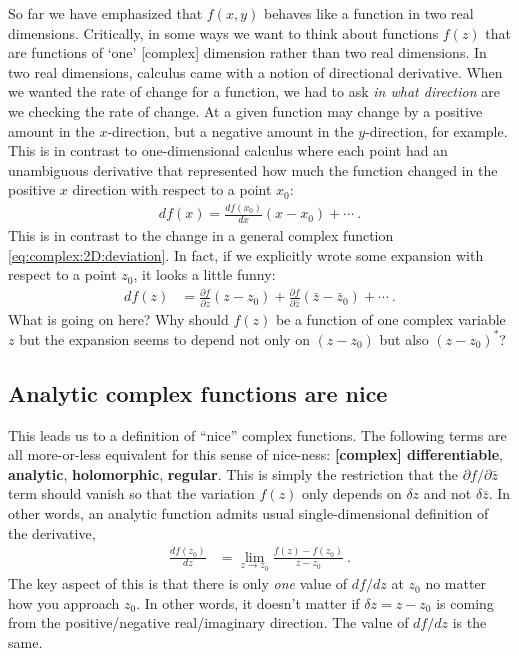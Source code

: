 So far we have emphasized that $f(x,y)$ behaves like a function in two real dimensions. Critically, in some ways we want to think about functions $f(z)$ that are functions of `one' [complex] dimension rather than two real dimensions. In two real dimensions, calculus came with a notion of directional derivative. When we wanted the rate of change for a function, we had to ask \emph{in what direction} are we checking the rate of change. At a given function may change by a positive amount in the $x$-direction, but a negative amount in the $y$-direction, for example. This is in contrast to one-dimensional calculus where each point had an unambiguous derivative that represented how much the function changed in the positive $x$ direction with respect to a point $x_0$:
\begin{align}
	df(x) = \frac{d f(x_0)}{d x} (x-x_0) + \cdots \ .
\end{align}
This is in contrast to the change in a general complex function \eqref{eq:complex:2D:deviation}. In fact, if we explicitly wrote some expansion with respect to a point $z_0$, it looks a little funny:
\begin{align}
	df(z) &= 
	\frac{\partial f}{\partial z}(z-z_0) +
	\frac{\partial f}{\partial \bar z}(\bar z-\bar z_0) + \cdots \ .
\end{align}
What is going on here? Why should $f(z)$ be a function of one complex variable $z$ but the expansion seems to depend not only on $(z-z_0)$ but also $(z-z_0)^*$? 

\subsection{Analytic complex functions are nice}

This leads us to a definition of ``nice'' complex functions. The following terms are all more-or-less equivalent for this sense of nice-ness: \textbf{[complex] differentiable}, \textbf{analytic}, \textbf{holomorphic}, \textbf{regular}. This is simply the restriction that the $\partial f/\partial \bar z$ term should vanish so that the variation $f(z)$ only depends on $\delta z$ and not $\delta\bar z$. In other words, an analytic function admits usual single-dimensional definition of the derivative,
\begin{align}
	\frac{df(z_0)}{dz} &= \lim_{z\to z_0} \frac{f(z)-f(z_0)}{z-z_0} \ .
	\label{eq:df:dz:analytic:def}
\end{align}
The key aspect of this is that there is only \emph{one} value of $df/dz$ at $z_0$ no matter how you approach $z_0$. In other words, it doesn't matter if $\delta z = z-z_0$ is coming from the positive/negative real/imaginary direction. The value of $df/dz$ is the same. 


